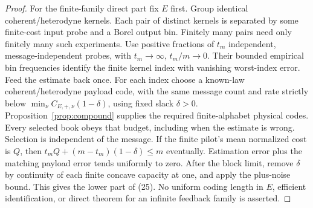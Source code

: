 \documentclass[11pt]{article}
\begin{document}
\begin{proof}
For the finite-family direct part fix \(E\) first. Group identical
coherent/heterodyne kernels. Each pair of distinct kernels is separated
by some finite-cost input probe and a Borel output bin. Finitely many
pairs need only finitely many such experiments. Use positive fractions
of \(t_m\) independent, message-independent probes, with
\(t_m\to\infty\), \(t_m/m\to0\). Their bounded empirical bin
frequencies identify the finite kernel index with vanishing worst-index
error. Feed the estimate back once. For each index choose a known-law
coherent/heterodyne payload code, with the same message count and rate
strictly below \(\min_\nu C_{E,+,\nu}(1-\delta)\), using fixed slack
\(\delta>0\). Proposition~\ref{prop:compound} supplies the required
finite-alphabet physical codes. Every selected book obeys that budget,
including when the estimate is wrong. Selection is independent of the
message. If the finite pilot's mean normalized cost is \(Q\), then
\(t_mQ+(m-t_m)(1-\delta)\leq m\) eventually. Estimation error plus the
matching payload error tends uniformly to zero. After the block limit,
remove \(\delta\) by continuity of each finite concave capacity at one,
and apply the plus-noise bound. This gives the lower part of (25).
No uniform coding length in \(E\), efficient identification, or direct
theorem for an infinite feedback family is asserted.
\end{proof}
\end{document}
